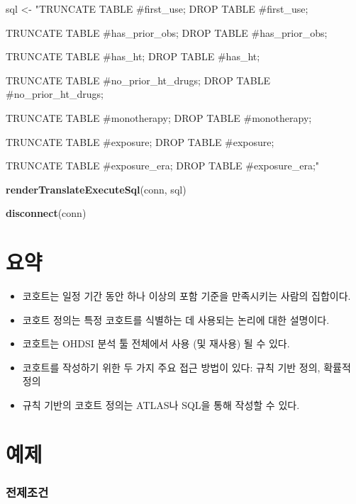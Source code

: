 \documentclass[10.5pt]{book}
\newenvironment{Shaded}{\begin{snugshade}}{\end{snugshade}}
\newcommand{\KeywordTok}[1]{\textcolor[rgb]{0.13,0.29,0.53}{\textbf{#1}}}
\newcommand{\StringTok}[1]{\textcolor[rgb]{0.31,0.60,0.02}{#1}}
\newcommand{\NormalTok}[1]{#1}
\theoremstyle{definition}
\theoremstyle{definition}
\theoremstyle{definition}
\theoremstyle{remark}
\let\BeginKnitrBlock\begin \let\EndKnitrBlock\end
\begin{document}
\begin{Shaded}
\begin{Highlighting}[]
\NormalTok{sql <-}\StringTok{ "TRUNCATE TABLE #first_use;}
\StringTok{DROP TABLE #first_use;}

\StringTok{TRUNCATE TABLE #has_prior_obs;}
\StringTok{DROP TABLE #has_prior_obs;}

\StringTok{TRUNCATE TABLE #has_ht;}
\StringTok{DROP TABLE #has_ht;}

\StringTok{TRUNCATE TABLE #no_prior_ht_drugs;}
\StringTok{DROP TABLE #no_prior_ht_drugs;}

\StringTok{TRUNCATE TABLE #monotherapy;}
\StringTok{DROP TABLE #monotherapy;}

\StringTok{TRUNCATE TABLE #exposure;}
\StringTok{DROP TABLE #exposure;}

\StringTok{TRUNCATE TABLE #exposure_era;}
\StringTok{DROP TABLE #exposure_era;"}

\KeywordTok{renderTranslateExecuteSql}\NormalTok{(conn, sql)}

\KeywordTok{disconnect}\NormalTok{(conn)}
\end{Highlighting}
\end{Shaded}

\section{요약}\label{-8}

\BeginKnitrBlock{rmdsummary}
\begin{itemize}
\item
  코호트는 일정 기간 동안 하나 이상의 포함 기준을 만족시키는 사람의
  집합이다.
\item
  코호트 정의는 특정 코호트를 식별하는 데 사용되는 논리에 대한 설명이다.
\item
  코호트는 OHDSI 분석 툴 전체에서 사용 (및 재사용) 될 수 있다.
\item
  코호트를 작성하기 위한 두 가지 주요 접근 방법이 있다: 규칙 기반 정의,
  확률적 정의
\item
  규칙 기반의 코호트 정의는 ATLAS나 SQL을 통해 작성할 수 있다.
\end{itemize}
\EndKnitrBlock{rmdsummary}

\section{예제}\label{-5}

\subsubsection*{전제조건}\label{-2}
\end{document}
